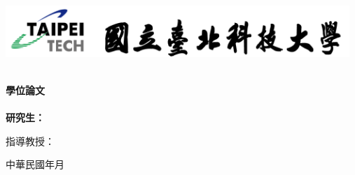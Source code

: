 \begin{titlepage}
    \newpage
    \begin{center}
        \includegraphics[width=13cm]{ntut-logo-with-label.png}
        
        \huge\bf\deptCname\\%
        \huge\bf\degreeCname 學位論文\\%

        \vfill
        \huge\bf\eTitle\\ %

        \vfill
        {\Large 研究生：\myCname}

        \vfill
        {\Large 指導教授：\advisorCname}

        \vfill
        {\Large 中華民國{\cYear 年}{\cMonth 月}}
    \end{center}
\end{titlepage}